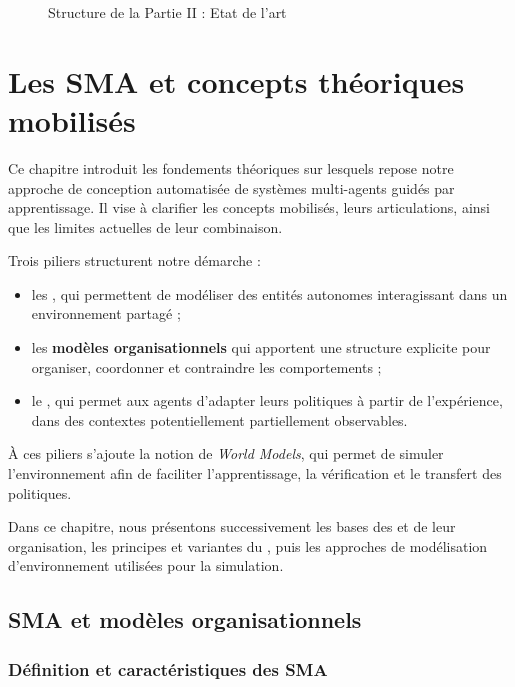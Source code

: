 \begin{figure}[h!]
    \centering
    \resizebox{\textwidth}{!}{%
        
    }
    \caption{Structure de la Partie II : Etat de l'art}
    \label{fig:organisation_manuscrit_partie_2}
\end{figure}

\chapter{Les SMA et concepts théoriques mobilisés}
\label{chap:concepts}

\noindent
Ce chapitre introduit les fondements théoriques sur lesquels repose notre approche de conception automatisée de systèmes multi-agents guidés par apprentissage. Il vise à clarifier les concepts mobilisés, leurs articulations, ainsi que les limites actuelles de leur combinaison.

Trois piliers structurent notre démarche :
\begin{itemize}
    \item les , qui permettent de modéliser des entités autonomes interagissant dans un environnement partagé ;
    \item les \textbf{modèles organisationnels} qui apportent une structure explicite pour organiser, coordonner et contraindre les comportements ;
    \item le , qui permet aux agents d'adapter leurs politiques à partir de l'expérience, dans des contextes potentiellement partiellement observables.
\end{itemize}

À ces piliers s'ajoute la notion de \textit{World Models}, qui permet de simuler l'environnement afin de faciliter l'apprentissage, la vérification et le transfert des politiques.

Dans ce chapitre, nous présentons successivement les bases des  et de leur organisation, les principes et variantes du , puis les approches de modélisation d'environnement utilisées pour la simulation.


\section{SMA et modèles organisationnels}

\subsection{Définition et caractéristiques des SMA}

